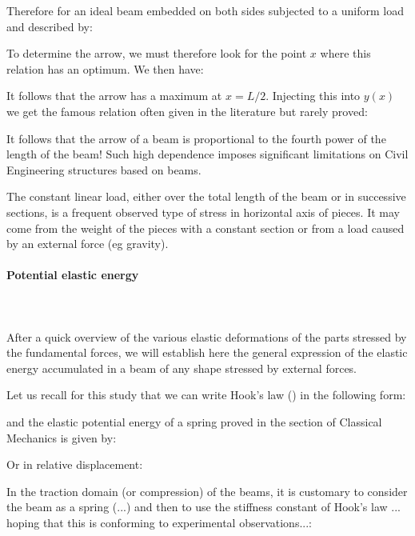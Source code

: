 	\begin{tcolorbox}[colframe=black,colback=white,sharp corners]
	
	Therefore for an ideal beam embedded on both sides subjected to a uniform load and described by:
	
	To determine the arrow, we must therefore look for the point $x$ where this relation has an optimum. We then have:
	
	It follows that the arrow has a maximum at $x = L / 2$. Injecting this into $y (x)$ we get the famous relation often given in the literature but rarely proved:
	
	It follows that the arrow of a beam is proportional to the fourth power of the length of the beam! Such high dependence imposes significant limitations on Civil Engineering structures based on beams.
	\end{tcolorbox}
	\begin{tcolorbox}[title=Remark,colframe=black,arc=10pt]
	The constant linear load, either over the total length of the beam or in successive sections, is a frequent observed type of stress in horizontal axis of pieces. It may come from the weight of the pieces with a constant section or from a load caused by an external force (eg gravity).
	\end{tcolorbox}
	
	\pagebreak
	\paragraph{Potential elastic energy}\mbox{}\\\\
	After a quick overview of the various elastic deformations of the parts stressed by the fundamental forces, we will establish here the general expression of the elastic energy accumulated in a beam of any shape stressed by external forces.

	Let us recall for this study that we can write Hook's law () in the following form:
	
	and the elastic potential energy of a spring proved in the section of Classical Mechanics is given by:
	
	Or in relative displacement:
	
	In the traction domain (or compression) of the beams, it is customary to consider the beam as a spring (...) and then to use the stiffness constant of Hook's law ... hoping that this is conforming to experimental observations...:
	
